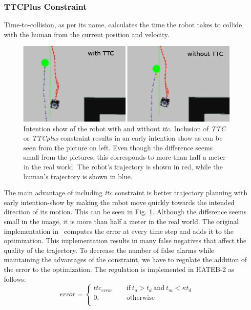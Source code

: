 \subsubsection{TTCPlus Constraint}
Time-to-collision, as per its name, calculates the time the robot takes to collide with the human from the current position and velocity. 
\begin{figure}[!h]
\centering
\includegraphics[width=0.9\columnwidth]{images/chapter3/ttc_importance_updated.png}
\caption{Intention show of the robot with and without \textit{\acrshort{ttc}}. Inclusion of \textit{TTC} or \textit{TTCplus} constraint results in an early intention show as can be seen from the picture on left. Even though the difference seems small from the pictures, this corresponds to more than half a meter in the real world. The robot's trajectory is shown in red, while the human's trajectory is shown in blue.}
\label{ttc_imp}
\end{figure}
The main advantage of including \textit{\acrshort{ttc}} constraint is better trajectory planning with early intention-show by making the robot move quickly towards the intended direction of its motion. This can be seen in Fig.  \ref{ttc_imp}. Although the difference seems small in the image, it is more than half a meter in the real world. The original implementation in~\cite{khambhaita2017viewing} computes the error at every time step and adds it to the optimization. This implementation results in many false negatives that affect the quality of the trajectory. To decrease the number of false alarms while maintaining the advantages of the constraint, we have to regulate the addition of the error to the optimization. The regulation is implemented in HATEB-2 as follows: 
\begin{equation}
error = 
     \begin{cases}
       ttc_{error}\ &\quad\text{if} \ t_a > t_d\ \text{and}\ t_m < \kappa t_d\\
       0,&\quad\text{otherwise}\\
     \end{cases}
     \label{ttc_eq}
\end{equation}
